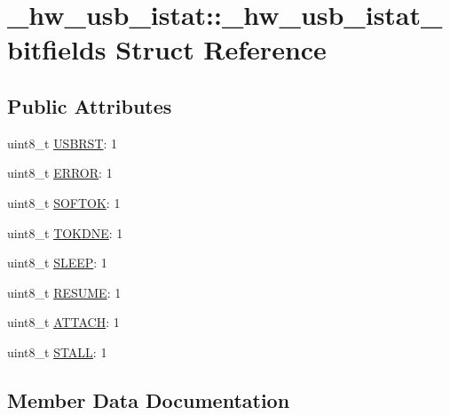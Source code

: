 \hypertarget{struct__hw__usb__istat_1_1__hw__usb__istat__bitfields}{}\section{\+\_\+hw\+\_\+usb\+\_\+istat\+:\+:\+\_\+hw\+\_\+usb\+\_\+istat\+\_\+bitfields Struct Reference}
\label{struct__hw__usb__istat_1_1__hw__usb__istat__bitfields}
\subsection*{Public Attributes}
\begin{DoxyCompactItemize}
\item 
uint8\+\_\+t \hyperlink{struct__hw__usb__istat_1_1__hw__usb__istat__bitfields_a6876f83efa62137d30fa1616f3a3d410}{U\+S\+B\+R\+ST}\+: 1
\item 
uint8\+\_\+t \hyperlink{struct__hw__usb__istat_1_1__hw__usb__istat__bitfields_a7b79c97b9d316b4bab3aea32010c2690}{E\+R\+R\+OR}\+: 1
\item 
uint8\+\_\+t \hyperlink{struct__hw__usb__istat_1_1__hw__usb__istat__bitfields_a2a1249be07e0c0d34653c2b734dd3db9}{S\+O\+F\+T\+OK}\+: 1
\item 
uint8\+\_\+t \hyperlink{struct__hw__usb__istat_1_1__hw__usb__istat__bitfields_a2288e8892239050dd911fb41b95c00a0}{T\+O\+K\+D\+NE}\+: 1
\item 
uint8\+\_\+t \hyperlink{struct__hw__usb__istat_1_1__hw__usb__istat__bitfields_aeeb1068a0f7ad83f70cc46d51a0c2ab5}{S\+L\+E\+EP}\+: 1
\item 
uint8\+\_\+t \hyperlink{struct__hw__usb__istat_1_1__hw__usb__istat__bitfields_a835f23b01fd4f65cb826fa8180def3fe}{R\+E\+S\+U\+ME}\+: 1
\item 
uint8\+\_\+t \hyperlink{struct__hw__usb__istat_1_1__hw__usb__istat__bitfields_ab1bb49401854d77376cebb449a795d81}{A\+T\+T\+A\+CH}\+: 1
\item 
uint8\+\_\+t \hyperlink{struct__hw__usb__istat_1_1__hw__usb__istat__bitfields_a7d80747c8b9768c108c049d95600aac4}{S\+T\+A\+LL}\+: 1
\end{DoxyCompactItemize}


\subsection{Member Data Documentation}
